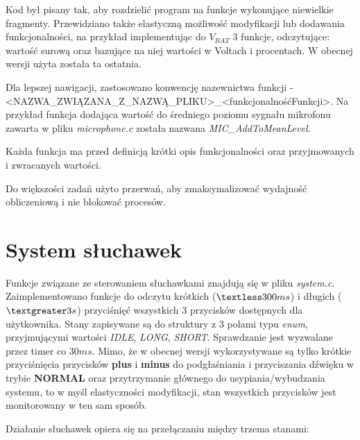 Kod był pisany tak, aby rozdzielić program na funkcje wykonujące niewielkie fragmenty. Przewidziano także elastyczną możliwość modyfikacji lub dodawania funkcjonalności, na przykład implementując do $V_{BAT}$ 3 funkcje, odczytujące: wartość surową oraz bazujące na niej wartości w Voltach i procentach. W obecnej wersji użyta została ta ostatnia.

Dla lepszej nawigacji, zastosowano konwencję nazewnictwa funkcji - <NAZWA\_ZWIĄZANA\_Z\_NAZWĄ\_PLIKU>\_<funkcjonalnośćFunkcji>. Na przykład funkcja dodająca wartość do średniego poziomu sygnału mikrofonu zawarta w pliku \textit{microphone.c} została nazwana \textit{MIC\_AddToMeanLevel}.

Każda funkcja ma przed definicją krótki opis funkcjonalności oraz przyjmowanych i zwracanych wartości.

Do większości zadań użyto przerwań, aby zmaksymalizować wydajność obliczeniową i nie blokować procesów.

\section{System słuchawek}
\label{cha:soft_sys}

Funkcje związane ze sterowaniem słuchawkami znajdują się w pliku \textit{system.c}. Zaimplementowano funkcje do odczytu krótkich ($\textless 300ms$) i długich ($\textgreater 3s$) przyciśnięć wszystkich 3 przycisków dostępnych dla użytkownika. Stany zapisywane są do struktury z 3 polami typu \textit{enum}, przyjmującymi wartości \textit{IDLE}, \textit{LONG}, \textit{SHORT}. Sprawdzanie jest wyzwalane przez timer co $30ms$. Mimo, że w obecnej wersji wykorzystywane są tylko krótkie przyciśnięcia przycisków \textbf{plus} i \textbf{minus} do podgłaśniania i przyciszania dźwięku w trybie \textbf{NORMAL} oraz przytrzymanie głównego do usypiania/wybudzania systemu, to w myśl elastyczności modyfikacji, stan wszystkich przycisków jest monitorowany w ten sam sposób.

Działanie słuchawek opiera się na przełączaniu między trzema stanami:

